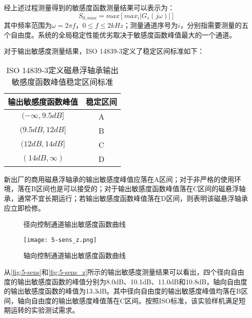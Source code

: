\documentclass[
  lang=cn,
  degree=master,
  openany,oneside
]{nuaathesis}
\begin{document}
经上述过程测量得到的敏感度函数测量结果可以表示为：
\begin{equation}
	S_{0,max} = max \left[ max_i \left|G_s(j\omega)\right| \right]
\end{equation}
其中频率范围为$\omega = 2 \pi f$，$0 \leq f \leq 2kHz$；测量通道序号为$i$，分别指需要测量的五个自由度。系统的全局稳定性能优劣取决于敏感度函数峰值最大的一个通道。

对于输出敏感度测量结果，ISO 14839-3定义了稳定区间标准如下：

\begin{table}[h!]
  \caption[ISO 14839-3定义磁悬浮轴承输出敏感度函数峰值稳定区间标准]{ISO 14839-3定义磁悬浮轴承输出敏感度函数峰值稳定区间标准\label{tab:amb_iso}}
  \begin{tabular}{cc}
    \toprule
    输出敏感度函数峰值 & 稳定区间 \\
    \midrule
    $(-\infty,9.5dB]$ & A\\
    $(9.5dB,12dB]$    & B\\
    $(12dB,14dB]$     & C\\
    $(14dB,\infty)$   & D\\
    \bottomrule
  \end{tabular}
\end{table}

新出厂的商用磁悬浮轴承的输出敏感度峰值应落在A区间；对于非严格的使用环境，落在B区间也是可以接受的；对于输出敏感度函数峰值落在C区间的磁悬浮轴承，通常不宜长期运行；若输出敏感度函数峰值落在D区间，则表明该磁悬浮轴承应立即检修。

\begin{figure}[h!]  
	\quad  
	\quad  	
	\quad  
	\quad  			
	\caption{径向控制通道输出敏感度函数曲线}  \label{fig:5-sens}
\end{figure}

\begin{figure}[h!]
	\texttt{[image: 5-sens\_z.png]}
	\caption{轴向控制通道输出敏感度函数曲线}
	\label{fig:5-sens_z}
\end{figure}

从\autoref{fig:5-sens}和\autoref{fig:5-sens_z}所示的输出敏感度测量结果可以看出，四个径向自由度的输出敏感度函数的峰值分别为8.0dB、10.1dB、11.0dB和10.8dB，轴向自由度的输出敏感度函数的峰值为13.3dB。其中径向自由度的输出敏感度峰值均落在B区间，轴向自由度的输出敏感度峰值落在C区间。按照ISO标准，该实验样机满足短期运转的实验测试需求。
\end{document}
